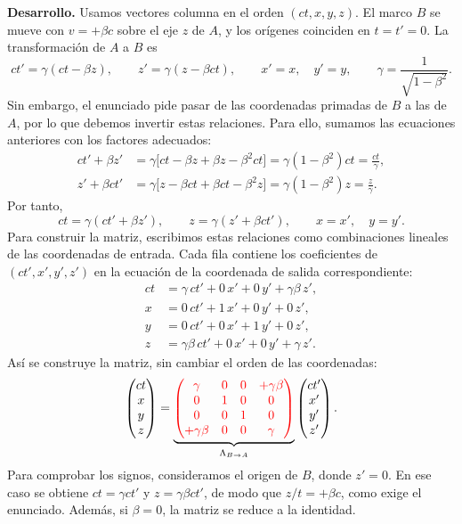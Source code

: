 \documentclass[a4paper,11pt]{article}
\begin{document}
\textbf{Desarrollo.} Usamos vectores columna en el orden $(ct,x,y,z)$. El marco $B$ se mueve con $v=+\beta c$ sobre el eje $z$ de $A$, y los orígenes coinciden en $t=t'=0$. La transformación de $A$ a $B$ es
\[
ct'=\gamma(ct-\beta z),\qquad z'=\gamma(z-\beta ct),
\qquad x'=x,\quad y'=y,\qquad
\gamma=\frac{1}{\sqrt{1-\beta^2}}.
\]
Sin embargo, el enunciado pide pasar de las coordenadas primadas de $B$ a las de $A$, por lo que debemos invertir estas relaciones. Para ello, sumamos las ecuaciones anteriores con los factores adecuados:
\[
\begin{aligned}
ct'+\beta z'&=\gamma\bigl[ct-\beta z+\beta z-\beta^2ct\bigr]
=\gamma(1-\beta^2)ct=\frac{ct}{\gamma},\\
z'+\beta ct'&=\gamma\bigl[z-\beta ct+\beta ct-\beta^2z\bigr]
=\gamma(1-\beta^2)z=\frac{z}{\gamma}.
\end{aligned}
\]
Por tanto,
\[
ct=\gamma(ct'+\beta z'),
\qquad z=\gamma(z'+\beta ct'),
\qquad x=x',\quad y=y'.
\]
Para construir la matriz, escribimos estas relaciones como combinaciones lineales de las coordenadas de entrada. Cada fila contiene los coeficientes de $(ct',x',y',z')$ en la ecuación de la coordenada de salida correspondiente:
\[
\begin{aligned}
ct&=\gamma\,ct'+0\,x'+0\,y'+\gamma\beta\,z',\\
x&=0\,ct'+1\,x'+0\,y'+0\,z',\\
y&=0\,ct'+0\,x'+1\,y'+0\,z',\\
z&=\gamma\beta\,ct'+0\,x'+0\,y'+\gamma\,z'.
\end{aligned}
\]
Así se construye la matriz, sin cambiar el orden de las coordenadas:
\[
\begin{pmatrix}ct\\x\\y\\z\end{pmatrix}
=\underbrace{\textcolor{red}{
\begin{pmatrix}
\gamma & 0 & 0 & +\gamma\beta \\
0 & 1 & 0 & 0 \\
0 & 0 & 1 & 0 \\
+\gamma\beta & 0 & 0 & \gamma
\end{pmatrix}}}_{\Lambda_{B\to A}}
\begin{pmatrix}ct'\\x'\\y'\\z'\end{pmatrix}.
\]
Para comprobar los signos, consideramos el origen de $B$, donde $z'=0$. En ese caso se obtiene $ct=\gamma ct'$ y $z=\gamma\beta ct'$, de modo que $z/t=+\beta c$, como exige el enunciado. Además, si $\beta=0$, la matriz se reduce a la identidad.
\end{document}
